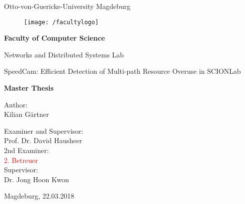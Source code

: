 \documentclass[thesis.tex]{subfiles}
\begin{document}
\thispagestyle {empty}

\begin{center}
\begin{Large}
Otto-von-Guericke-University Magdeburg\\

\begin{figure}
	\centering
	\texttt{[image: /facultylogo]}
	\label{fig:logoinffak}
\end{figure}

\vspace{3mm}

\textbf{Faculty of Computer Science}\\
\end{Large}

\vspace{3mm}

Networks and Distributed Systems Lab\\

\vspace{1cm}
\begin{Huge}
SpeedCam: Efficient Detection of Multi-path Resource Overuse in SCIONLab \\
\end{Huge}
\vspace{15mm}
{\Huge \textbf{Master Thesis}}\\
\vspace{15mm}

Author:\\
\vspace{4mm}
{\huge Kilian G\"{a}rtner}\\

\vspace{16mm}

Examiner and Supervisor:\\
\vspace{2mm}
{\Large Prof. Dr. David Hausheer}\\
\vspace{4mm}
2nd Examiner:\\
\vspace{2mm}
{\Large \textcolor{red}{2. Betreuer}}\\
\vspace{10mm}
Supervisor:\\
\vspace{2mm}
{\large Dr. Jong Hoon Kwon}\\


\vspace{25mm}

{\large Magdeburg, 22.03.2018}\\

\vspace{40mm}

\end{center}
\clearpage
\end{document}
